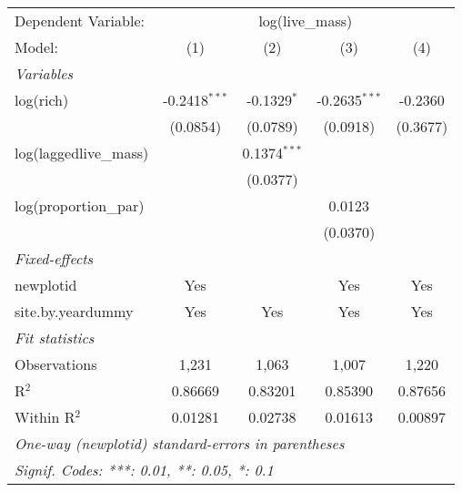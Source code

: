 \begin{tabular}{lcccc}
\tabularnewline\midrule\midrule
Dependent Variable:&\multicolumn{4}{c}{log(live\_mass)}\\
Model:&(1) & (2) & (3) & (4)\\
\midrule \emph{Variables}&   &   &   &  \\
log(rich)&-0.2418$^{***}$ & -0.1329$^{*}$ & -0.2635$^{***}$ & -0.2360\\
  &(0.0854) & (0.0789) & (0.0918) & (0.3677)\\
log(laggedlive\_mass)&   & 0.1374$^{***}$ &    &   \\
  &   & (0.0377) &    &   \\
log(proportion\_par)&   &    & 0.0123 &   \\
  &   &    & (0.0370) &   \\
\midrule \emph{Fixed-effects}&   &   &   &  \\
newplotid & Yes &  & Yes & Yes\\
site.by.yeardummy & Yes & Yes & Yes & Yes\\
\midrule \emph{Fit statistics}&  & & & \\
Observations & 1,231&1,063&1,007&1,220\\
R$^2$ & 0.86669&0.83201&0.85390&0.87656\\
Within R$^2$ & 0.01281&0.02738&0.01613&0.00897\\
\midrule\midrule\multicolumn{5}{l}{\emph{One-way (newplotid) standard-errors in parentheses}}\\
\multicolumn{5}{l}{\emph{Signif. Codes: ***: 0.01, **: 0.05, *: 0.1}}\\
\end{tabular}


